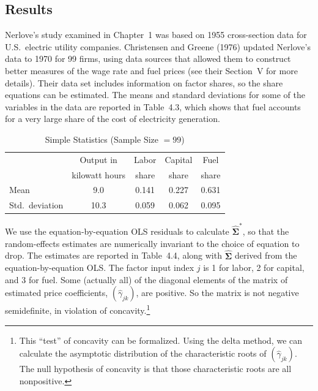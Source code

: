 \subsection*{Results}

Nerlove's study examined in Chapter~1 was based on 1955 cross-section data for
U.S.\ electric utility companies. Christensen and Greene (1976) updated Nerlove's
data to 1970 for 99 firms, using data sources that allowed them to construct better
measures of the wage rate and fuel prices (see their Section~V for more details).
Their data set includes information on factor shares, so the share equations can be
estimated. The means and standard deviations for some of the variables in the data
are reported in Table~4.3, which shows that fuel accounts for a very large share of
the cost of electricity generation.

\begin{table}[htbp]
\centering
\caption{Simple Statistics (Sample Size $= 99$)}
\label{tab:4.3}
\medskip
\begin{tabular}{@{}lcccc@{}}
\toprule
& Output in & Labor & Capital & Fuel \\
& kilowatt hours & share & share & share \\
\midrule
Mean & 9.0 & 0.141 & 0.227 & 0.631 \\
Std.\ deviation & 10.3 & 0.059 & 0.062 & 0.095 \\
\bottomrule
\end{tabular}
\end{table}

We use the equation-by-equation OLS residuals to calculate
$\widehat{\boldsymbol{\Sigma}}^*$, so that the random-effects estimates are
numerically invariant to the choice of equation to drop. The estimates are reported
in Table~4.4, along with $\widehat{\boldsymbol{\Sigma}}$ derived from the
equation-by-equation OLS. The factor input index $j$ is 1 for labor, 2 for capital,
and 3 for fuel. Some (actually all) of the diagonal elements of the matrix of
estimated price coefficients, $(\hat{\gamma}_{jk})$, are positive.
So the matrix is not negative semidefinite, in violation of concavity.\footnote{This
``test'' of concavity can be formalized. Using the delta method, we can calculate
the asymptotic distribution of the characteristic roots of $(\hat{\gamma}_{jk})$.
The null hypothesis of concavity is that those characteristic roots are all nonpositive.}

